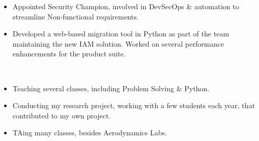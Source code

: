 \documentclass[10pt,a4paper,ragged2e,withhyper]{altacv}
\begin{document}
\begin{paracol}{2}

\begin{itemize}
\item Appointed Security Champion, involved in DevSecOps \& automation to streamline Non-functional requirements.
\item Developed a web-based migration tool in Python as part of the team maintaining the new IAM solution. Worked on several performance enhancements for the product suite.
\end{itemize}
\smallskip
{} \\

\divider

\begin{itemize}
\item Teaching several classes, including Problem Solving \& Python.
\end{itemize}
{}

\divider


\divider


\divider

\begin{itemize}
\item Conducting my research project, working with a few students each year, that contributed to my own project.
\item TAing many classes, besides Aerodynamics Labs.
\end{itemize}
\smallskip
{}


\end{paracol}
\end{document}
